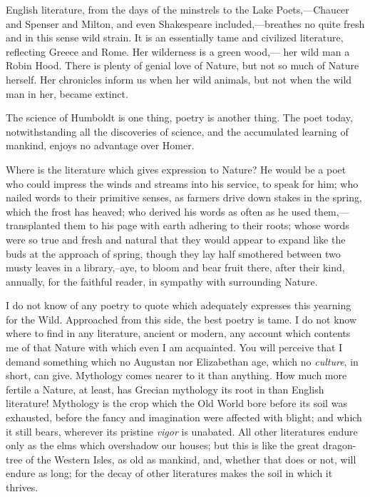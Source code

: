 \documentclass[twoside,openright,10pt]{memoir} %
\begin{document}
English literature, from the days of the minstrels to the Lake Poets,—Chaucer and Spenser and Milton, and even Shakespeare included,—breathes no quite fresh and in this sense wild strain. It is an essentially tame and civilized literature, reflecting Greece and Rome. Her wilderness is a green wood,— her wild man a Robin Hood. There is plenty of genial love of Nature, but not so much of Nature herself. Her chronicles inform us when her wild animals, but not when the wild man in her, became extinct.

The science of Humboldt is one thing, poetry is another thing. The poet today, notwithstanding all the discoveries of science, and the accumulated learning of mankind, enjoys no advantage over Homer.

Where is the literature which gives expression to Nature? He would be a poet who could impress the winds and streams into his service, to speak for him; who nailed words to their primitive senses, as farmers drive down stakes in the spring, which the frost has heaved; who derived his words as often as he used them,—transplanted them to his page with earth adhering to their roots; whose words were so true and fresh and natural that they would appear to expand like the buds at the approach of spring, though they lay half smothered between two musty leaves in a library,--aye, to bloom and bear fruit there, after their kind, annually, for the faithful reader, in sympathy with surrounding Nature.

I do not know of any poetry to quote which adequately expresses this yearning for the Wild. Approached from this side, the best poetry is tame. I do not know where to find in any literature, ancient or modern, any account which contents me of that Nature with which even I am acquainted. You will perceive that I demand something which no Augustan nor Elizabethan age, which no \emph{culture}, in short, can give. Mythology comes nearer to it than anything. How much more fertile a Nature, at least, has Grecian mythology its root in than English literature! Mythology is the crop which the Old World bore before its soil was exhausted, before the fancy and imagination were affected with blight; and which it still bears, wherever its pristine \emph{vigor} is unabated. All other literatures endure only as the elms which overshadow our houses; but this is like the great dragon-tree of the Western Isles, as old as mankind, and, whether that does or not, will endure as long; for the decay of other literatures makes the soil in which it thrives.
\end{document}
